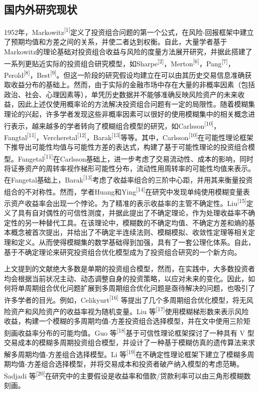 \documentclass[]{article}
\begin{document}
\hypertarget{header-n8}{%
\subsection{国内外研究现状}\label{header-n8}}

1952年，Markowitz\textsuperscript{{[}1{]}}定义了投资组合问题的第一个公式，在风险-回报框架中建立了预期均值和方差之间的关系，并使二者达到权衡。自此，大量学者基于Markowitz的理论基础对投资组合收益与风险的度量方法展开研究，并据此搭建了一系列更贴近实际的投资组合研究模型，如Sharpe\textsuperscript{{[}2{]}}，Merton\textsuperscript{{[}6{]}}，Pang\textsuperscript{{[}7{]}}，Perold\textsuperscript{{[}8{]}}，Best\textsuperscript{{[}9{]}}。但这一阶段的研究假设均建立在可以由其历史交易信息准确获取收益分布的基础上。然而，由于实际的金融市场中存在大量的非概率因素（包括政治、社会、心理因素等），单凭历史数据并不能够准确反映风险资产的未来收益，因此上述仅使用概率论的方法解决投资组合问题有一定的局限性。随着模糊集理论的兴起，许多学者发现这些非概率因素可以很好的使用模糊集中的相关概念进行表示，越来越多的学者转向了模糊组合模型的研究，如Carlsson\textsuperscript{{[}10{]}}，Fangtal\textsuperscript{{[}11{]}}，Vercheretal\textsuperscript{{[}12{]}}，Barak\textsuperscript{{[}13{]}}等等。其中，Carlsson\textsuperscript{{[}10{]}}在可能性理论框架下推导出可能性均值与可能性方差的表达式，构建了基于可能性理论的投资组合模型。Fangetal\textsuperscript{{[}11{]}}在Carlsson基础上，进一步考虑了交易流动性、成本的影响，同时将证券资产的周转率视作梯形可能性分布，流动性用周转率的可能性均值来表示。在Fangetal基础上，Barak\textsuperscript{{[}13{]}}考虑了收益率组合的三阶中心距，并用其来衡量投资组合的不对称性。然而，学者Huang和Ying\textsuperscript{{[}14{]}}在研究中发现单纯使用模糊变量表示资产收益率会出现一个悖论。为了精准的表示收益率的主管不确定性。Liu\textsuperscript{{[}15{]}}定义了具有自对偶性的可信性测度，并据此提出了不确定理论，作为处理收益率不确定性的另一种替代工具。在该理论中，模糊数的不确定均值、不确定方差和熵的基本概念被首次提出，并给出了不确定半连续法则、模糊模拟、收敛性定理等相关定理和定义。从而使得模糊集的数学基础得到加强，具有了一套公理化体系。自此，基于不确定理论来研究投资组合优化模型成为了投资组合研究的一个新方向。

上文提到的文献绝大多数是单期的投资组合模型，然而，在实践中，大多数投资者均会根据当前状况主动、动态调整自身的投资策略，以应对未来的变化。因此，如何将单周期组合优化问题扩展到多周期组合优化问题是亟待解决的问题，也吸引了许多学者的目光。例如，Celikyurt\textsuperscript{{[}16{]}}
等提出了几个多周期组合优化模型，将无风险资产和风险资产的收益率视为随机变量。Liu
等\textsuperscript{{[}17{]}}使用模糊梯形数来表示风险收益，构建一个模糊的多周期均值-方差投资组合选择模型，并在文中使用三阶矩刻画收益率分布的可能均值。Guo
等\textsuperscript{{[}18{]}}基于可信性理论框架探讨了一种具有 V
型交易成本的模糊多周期投资组合模型，并设计了一种基于模糊仿真的遗传算法来求解多周期均值-方差组合选择模型。Li
等\textsuperscript{{[}19{]}}在不确定性理论框架下建立了模糊多周期均值-方差组合选择模型，并将交易成本和投资者破产纳入模型的考虑范畴。Sadjadi
等\textsuperscript{{[}20{]}}在研究中的主要假设是收益率和借款/贷款利率可以由三角形模糊数刻画。
\end{document}
